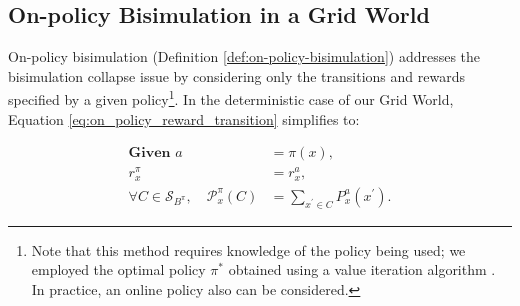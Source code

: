 
\subsection{On-policy Bisimulation in a Grid World}
On-policy bisimulation (Definition \ref{def:on-policy-bisimulation}) addresses the bisimulation collapse issue by considering only the transitions and rewards specified by a given policy\footnote{Note that this method requires knowledge of the policy being used; we employed the optimal policy $\pi^*$ obtained using a value iteration algorithm \cite{sutton2018reinforcement}. In practice, an online policy also can be considered.}. In the deterministic case of our Grid World, Equation \ref{eq:on_policy_reward_transition} simplifies to:

\begin{equation}
\begin{aligned}
\textbf{Given } a &= \pi(x), \\
r_x^\pi &= r_x^a, \\
\forall C \in \mathcal{S}_{B^\pi}, \quad \mathcal{P}_x^\pi(C) &= \sum_{x^{\prime} \in C} P_x^a(x^{\prime}).
\end{aligned}
\end{equation}

